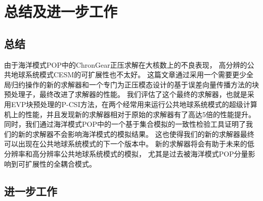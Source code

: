 \chapter{总结及进一步工作}
\label{cha:conclusion}

\section{总结}
\label{sec:conclude}
由于海洋模式POP中的ChronGear正压求解在大核数上的不良表现， 高分辨的公共地球系统模式CESM的可扩展性也不太好。
这篇文章通过采用一个需要更少全局归约操作的新的求解器和一个专门为正压模态设计的基于误差向量传播方法的块预处理子，最终改进了求解器的性能。 
我们评估了这个最终的求解器，也就是采用EVP块预处理的P-CSI方法，在两个经常用来运行公共地球系统模式的超级计算机上的性能，并且发现新的求解器相对于原始的求解器有了高达5倍的性能提升。
同时，我们通过海洋模式POP中的一个基于集合模拟的一致性检验工具证明了我们的新的求解器不会影响海洋模式的模拟结果。 
这也使得我们的新的求解器最终可以出现在公共地球系统模式的下一个版本中。 
新的求解器将会有助于未来的低分辨率和高分辨率公共地球系统模式的模拟， 尤其是过去被海洋模式POP分量影响到可扩展性的全耦合模式。 
\section{进一步工作}
\label{sec:futurework}
